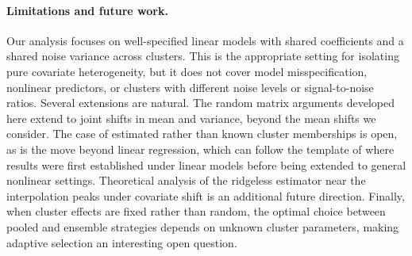 \documentclass{article}
\theoremstyle{plain}
\theoremstyle{remark}
\begin{document}
\paragraph{Limitations and future work.}
Our analysis focuses on well-specified linear models with shared coefficients and a shared noise variance across clusters. This is the appropriate setting for isolating pure covariate heterogeneity, but it does not cover model misspecification, nonlinear predictors, or clusters with different noise levels or signal-to-noise ratios. Several extensions are natural. The random matrix arguments developed here extend to joint shifts in mean and variance, beyond the mean shifts we consider. The case of estimated rather than known cluster memberships is open, as is the move beyond linear regression, which can follow the template of \cite{hastie2019surprises} where results were first established under linear models before being extended to general nonlinear settings. Theoretical analysis of the ridgeless estimator near the interpolation peaks under covariate shift is an additional future direction. Finally, when cluster effects are fixed rather than random, the optimal choice between pooled and ensemble strategies depends on unknown cluster parameters, making adaptive selection an interesting open question.

\newpage





\appendix





\end{document}
